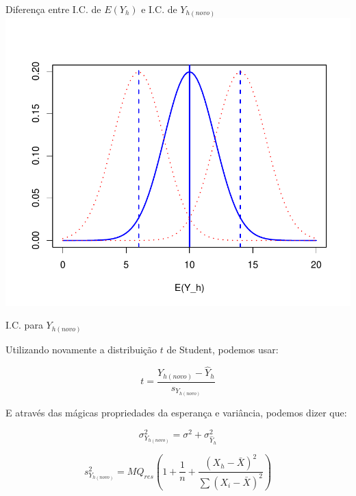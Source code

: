\documentclass{beamer}\usepackage[]{graphicx}\usepackage[]{color}
\newenvironment{knitrout}{}{} %
\renewenvironment{knitrout}{\setlength{\topsep}{0mm}}{}
\begin{document}
\begin{frame}{Diferença entre I.C. de $E(Y_h)$ e I.C. de $Y_{h(novo)}$}
\centering
\begin{knitrout}
\color{fgcolor}
\includegraphics[width=0.8\linewidth]{figure/unnamed-chunk-8-1} 

\end{knitrout}

\end{frame}

\begin{frame}{I.C. para $Y_{h(novo)}$}

Utilizando novamente a distribuição $t$ de Student, podemos usar:

\begin{equation*}
t = \frac{Y_{h(novo)}- \hat Y_h}{s_{Y_{h(novo)}}}
\end{equation*}

E através das mágicas propriedades da esperança e variância, podemos dizer que:

\begin{equation*}
\sigma^2_{Y_{h(novo)}} = \sigma ^2 + \sigma^2 _{\hat Y_h}
\end{equation*}

\begin{equation*}
s^2_{Y_{h(novo)}} = MQ_{res} \left( 1 + \frac{1}{n} + \frac{(X_h - \bar X)^2}{\sum(X_i - \bar X)^2} \right)
\end{equation*}

\end{frame}
\end{document}
